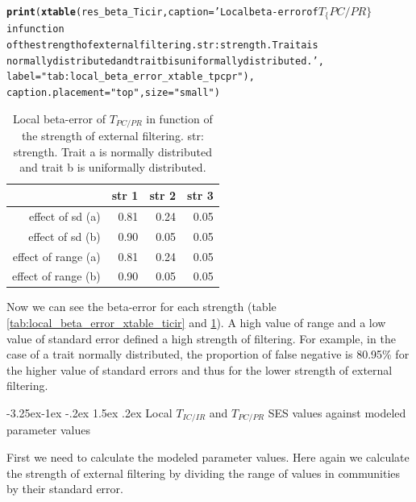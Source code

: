 \documentclass[12pt]{article}\usepackage[]{graphicx}\usepackage[]{color}
\makeatletter
\newcommand{\hlstr}[1]{\textcolor[rgb]{0.192,0.494,0.8}{#1}}%
\newcommand{\hlstd}[1]{\textcolor[rgb]{0.345,0.345,0.345}{#1}}%
\newcommand{\hlkwc}[1]{\textcolor[rgb]{0.333,0.667,0.333}{#1}}%
\newcommand{\hlkwd}[1]{\textcolor[rgb]{0.737,0.353,0.396}{\textbf{#1}}}%
\newenvironment{kframe}{%
 \def\at@end@of@kframe{}%
 \ifinner\ifhmode%
  \def\at@end@of@kframe{\end{minipage}}%
  \begin{minipage}{\columnwidth}%
 \fi\fi%
 \def\FrameCommand##1{\hskip\@totalleftmargin \hskip-\fboxsep
 \colorbox{shadecolor}{##1}\hskip-\fboxsep
     \hskip-\linewidth \hskip-\@totalleftmargin \hskip\columnwidth}%
 \MakeFramed {\advance\hsize-\width
   \@totalleftmargin\z@ \linewidth\hsize
   \@setminipage}}%
 {\par\unskip\endMakeFramed%
 \at@end@of@kframe}
\newcounter {subsubsubsection}[subsubsection]
\newcommand\subsubsubsection{\@startsection{subsubsubsection}{4}{\z@}%
          {-3.25ex\@plus -1ex \@minus -.2ex}%
          {1.5ex \@plus .2ex}%
          {\normalfont\normalsize\bfseries}}
\makeatother
\begin{document}
\begin{kframe}
\begin{alltt}
\hlkwd{print}\hlstd{(}\hlkwd{xtable}\hlstd{(res_beta_Ticir,} \hlkwc{caption} \hlstd{=} \hlstr{'Local beta-error of $T_\{PC/PR\}$ in function 
             of the strength of external filtering. str: strength. Trait a is 
             normally distributed and trait b is uniformally distributed.'}\hlstd{,}
             \hlkwc{label} \hlstd{=} \hlstr{"tab:local_beta_error_xtable_tpcpr"}\hlstd{),}
      \hlkwc{caption.placement} \hlstd{=} \hlstr{"top"}\hlstd{,} \hlkwc{size} \hlstd{=} \hlstr{"small"}\hlstd{)}
\end{alltt}
\end{kframe}%
\begin{table}[ht]
\centering
\caption{Local beta-error of $T_{PC/PR}$ in function 
             of the strength of external filtering. str: strength. Trait a is 
             normally distributed and trait b is uniformally distributed.} 
\label{tab:local_beta_error_xtable_tpcpr}
{\small
\begin{tabular}{rrrr}
  \hline
 & str 1 & str 2 & str 3 \\ 
  \hline
effect of sd (a) & 0.81 & 0.24 & 0.05 \\ 
  effect of sd (b) & 0.90 & 0.05 & 0.05 \\ 
  effect of range (a) & 0.81 & 0.24 & 0.05 \\ 
  effect of range (b) & 0.90 & 0.05 & 0.05 \\ 
   \hline
\end{tabular}
}
\end{table}

 
Now we can see the beta-error for each strength (table \ref{tab:local_beta_error_xtable_ticir} and \ref{tab:local_beta_error_xtable_tpcpr}). A high value of range and a low value of standard error defined a high strength of filtering. For example, in the case of a trait normally distributed, the proportion of false negative is 80.95\% for the higher value of standard errors and thus for the lower strength of external filtering.
 
 
  \subsubsubsection {Local $T_{IC/IR}$ and $T_{PC/PR}$ SES values against modeled parameter values}
  
  First we need to calculate the modeled parameter values. Here again we calculate the strength of external filtering by dividing the range of values in communities by their standard error.
  
\end{document}

